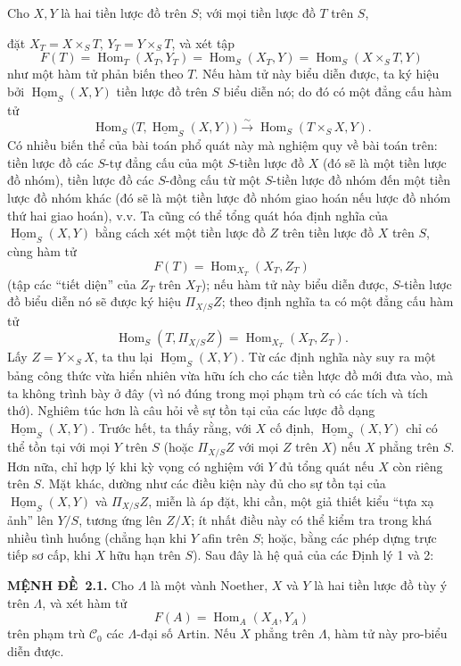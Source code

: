 \documentclass[11pt,twoside,openany]{book}
\numberwithin{equation}{section}
\newcommand{\src}[1]{%
  \phantomsection\hypertarget{src:\fgasourceid:#1}{}%
  \marginpar{\raggedleft\footnotesize\sffamily #1}%
}
\newcommand{\fgasourceid}{unset}
\newcommand{\result}[2]{\par\medskip\noindent\textbf{#1\if\relax\detokenize{#2}\relax\else\ #2\fi.}\quad}
\begin{document}
Cho $X,Y$ là hai tiền lược đồ trên $S$; với mọi tiền lược đồ $T$ trên $S$,

\src{381}
đặt $X_T=X\times_ST$, $Y_T=Y\times_ST$, và xét tập
\[
  F(T)=\operatorname{Hom}_T(X_T,Y_T)
      =\operatorname{Hom}_S(X_T,Y)
      =\operatorname{Hom}_S(X\times_ST,Y)
\]
như một hàm tử phản biến theo $T$. Nếu hàm tử này biểu diễn được, ta ký hiệu
bởi $\underline{\operatorname{Hom}}_S(X,Y)$ tiền lược đồ trên $S$ biểu diễn
nó; do đó có một đẳng cấu hàm tử
\[
  \operatorname{Hom}_S
  \bigl(T,\underline{\operatorname{Hom}}_S(X,Y)\bigr)
  \xrightarrow{\sim}
  \operatorname{Hom}_S(T\times_SX,Y).
\]
Có nhiều biến thể của bài toán phổ quát này mà nghiệm quy về bài toán trên:
tiền lược đồ các $S$-tự đẳng cấu của một $S$-tiền lược đồ $X$ (đó sẽ là một
tiền lược đồ nhóm), tiền lược đồ các $S$-đồng cấu từ một $S$-tiền lược đồ nhóm
đến một tiền lược đồ nhóm khác (đó sẽ là một tiền lược đồ nhóm giao hoán nếu
lược đồ nhóm thứ hai giao hoán), v.v. Ta cũng có thể tổng quát hóa định nghĩa
của $\underline{\operatorname{Hom}}_S(X,Y)$ bằng cách xét một tiền lược đồ $Z$
trên tiền lược đồ $X$ trên $S$, cùng hàm tử
\[
  F(T)=\operatorname{Hom}_{X_T}(X_T,Z_T)
\]
(tập các ``tiết diện'' của $Z_T$ trên $X_T$); nếu hàm tử này biểu diễn được,
$S$-tiền lược đồ biểu diễn nó sẽ được ký hiệu $\Pi_{X/S}Z$; theo định nghĩa ta
có một đẳng cấu hàm tử
\[
  \operatorname{Hom}_S(T,\Pi_{X/S}Z)
  =\operatorname{Hom}_{X_T}(X_T,Z_T).
\]
Lấy $Z=Y\times_SX$, ta thu lại
$\underline{\operatorname{Hom}}_S(X,Y)$. Từ các định nghĩa này suy ra một bảng
công thức vừa hiển nhiên vừa hữu ích cho các tiền lược đồ mới đưa vào, mà ta
không trình bày ở đây (vì nó đúng trong mọi phạm trù có các tích và tích thớ).
Nghiêm túc hơn là câu hỏi về sự tồn tại của các lược đồ dạng
$\underline{\operatorname{Hom}}_S(X,Y)$. Trước hết, ta thấy rằng, với $X$ cố
định, $\underline{\operatorname{Hom}}_S(X,Y)$ chỉ có thể tồn tại với mọi $Y$
trên $S$ (hoặc $\Pi_{X/S}Z$ với mọi $Z$ trên $X$) nếu $X$ phẳng trên $S$.
Hơn nữa, chỉ hợp lý khi kỳ vọng có nghiệm với $Y$ đủ tổng quát nếu $X$ còn
riêng trên $S$. Mặt khác, dường như các điều kiện này đủ cho sự tồn tại của
$\underline{\operatorname{Hom}}_S(X,Y)$ và $\Pi_{X/S}Z$, miễn là áp đặt, khi
cần, một giả thiết kiểu ``tựa xạ ảnh'' lên $Y/S$, tương ứng lên $Z/X$; ít nhất
điều này có thể kiểm tra trong khá nhiều tình huống (chẳng hạn khi $Y$ afin
trên $S$; hoặc, bằng các phép dựng trực tiếp sơ cấp, khi $X$ hữu hạn trên $S$).
Sau đây là hệ quả của các Định lý 1 và 2:

\src{382}
\result{MỆNH ĐỀ}{2.1} Cho $\Lambda$ là một vành Noether, $X$ và $Y$ là hai
tiền lược đồ tùy ý trên $\Lambda$, và xét hàm tử
\[
  F(A)=\operatorname{Hom}_A(X_A,Y_A)
\]
trên phạm trù $\mathcal C_0$ các $\Lambda$-đại số Artin. Nếu $X$ phẳng trên
$\Lambda$, hàm tử này pro-biểu diễn được.
\end{document}
